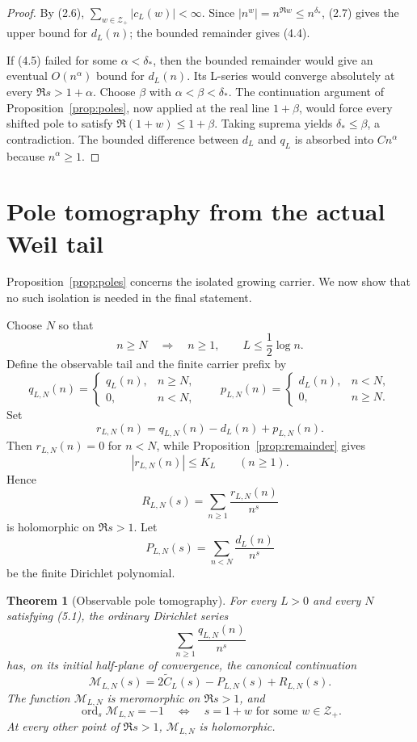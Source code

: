 \documentclass[11pt]{article}
\newtheorem{theorem}{Theorem}[section]
\newcommand{\cZ}{\mathcal Z}
\newcommand{\cM}{\mathcal M}
\newcommand{\ord}{\operatorname{ord}}
\begin{document}
\begin{proof}
By (2.6), $\sum_{w\in\cZ_+}|c_L(w)|<\infty$.  Since
$|n^w|=n^{\Re w}\le n^{\delta_*}$, (2.7) gives the upper bound for $d_L(n)$; the bounded
remainder gives (4.4).

If (4.5) failed for some $\alpha<\delta_*$, then the bounded remainder would give an eventual
$O(n^\alpha)$ bound for $d_L(n)$.  Its L-series would converge absolutely at every
$\Re s>1+\alpha$.  Choose $\beta$ with $\alpha<\beta<\delta_*$.  The continuation argument of
Proposition~\ref{prop:poles}, now applied at the real line $1+\beta$, would force every shifted
pole to satisfy $\Re(1+w)\le1+\beta$.  Taking suprema yields $\delta_*\le\beta$, a contradiction.
The bounded difference between $d_L$ and $q_L$ is absorbed into $Cn^\alpha$ because
$n^\alpha\ge1$.
\end{proof}

\section{Pole tomography from the actual Weil tail}

Proposition~\ref{prop:poles} concerns the isolated growing carrier.  We now show that no such
isolation is needed in the final statement.

Choose $N$ so that
\[
  n\ge N\quad\Longrightarrow\quad n\ge1,
  \qquad L\le\frac12\log n.
  \tag{5.1}
\]
Define the observable tail and the finite carrier prefix by
\[
  q_{L,N}(n)=\begin{cases}q_L(n),&n\ge N,\\0,&n<N,\end{cases}
  \qquad
  p_{L,N}(n)=\begin{cases}d_L(n),&n<N,\\0,&n\ge N.\end{cases}
  \tag{5.2}
\]
Set
\[
  r_{L,N}(n)=q_{L,N}(n)-d_L(n)+p_{L,N}(n).
  \tag{5.3}
\]
Then $r_{L,N}(n)=0$ for $n<N$, while Proposition~\ref{prop:remainder} gives
\[
  |r_{L,N}(n)|\le K_L\qquad(n\ge1).
  \tag{5.4}
\]
Hence
\[
  R_{L,N}(s)=\sum_{n\ge1}\frac{r_{L,N}(n)}{n^s}
  \tag{5.5}
\]
is holomorphic on $\Re s>1$.  Let
\[
  P_{L,N}(s)=\sum_{n<N}\frac{d_L(n)}{n^s}
  \tag{5.6}
\]
be the finite Dirichlet polynomial.

\begin{theorem}[Observable pole tomography]\label{thm:tomography}
For every $L>0$ and every $N$ satisfying (5.1), the ordinary Dirichlet series
\[
  \sum_{n\ge1}\frac{q_{L,N}(n)}{n^s}
  \tag{5.7}
\]
has, on its initial half-plane of convergence, the canonical continuation
\[
  \cM_{L,N}(s)=2\widetilde C_L(s)-P_{L,N}(s)+R_{L,N}(s).
  \tag{5.8}
\]
The function $\cM_{L,N}$ is meromorphic on $\Re s>1$, and
\[
  \ord_s\cM_{L,N}=-1
  \quad\Longleftrightarrow\quad
  s=1+w\text{ for some }w\in\cZ_+.
  \tag{5.9}
\]
At every other point of $\Re s>1$, $\cM_{L,N}$ is holomorphic.
\end{theorem}
\end{document}
